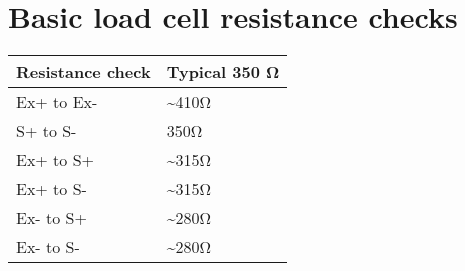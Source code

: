 \documentclass[11pt]{article}
\begin{document}
\section{Basic load cell resistance checks}
\label{sec:org6f322a9}
\begin{center}
\begin{tabular}{ll}
Resistance check & Typical 350 Ω\\
\hline
Ex+ to Ex- & \textasciitilde{}410Ω\\
S+ to S- & 350Ω\\
Ex+ to S+ & \textasciitilde{}315Ω\\
Ex+ to S- & \textasciitilde{}315Ω\\
Ex- to S+ & \textasciitilde{}280Ω\\
Ex- to S- & \textasciitilde{}280Ω\\
\end{tabular}
\end{center}
\end{document}
